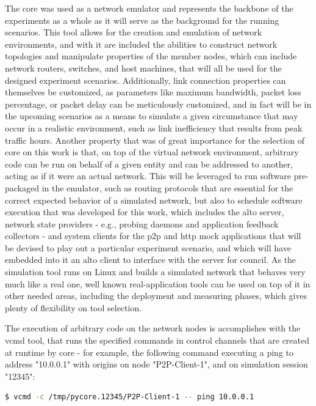     The \gls{core} \cite{core} was used as a network emulator and represents the backbone of the experiments as a whole as it will serve as the background for the running scenarios.
    This tool allows for the creation and emulation of network environments, and with it are included the abilities to construct network topologies and manipulate properties of the member nodes, which can include network routers, switches, and host machines, that will all be used for the designed experiment scenarios.
    Additionally, link connection properties can themselves be customized, as parameters like maximum bandwidth, packet loss percentage, or packet delay can be meticulously customized, and in fact will be in the upcoming scenarios as a means to simulate a given circumstance that may occur in a realistic environment, such as link inefficiency that results from peak traffic hours.
    Another property that was of great importance for the selection of \gls{core} on this work is that, on top of the virtual network environment, arbitrary code can be run on behalf of a given entity and can be addressed to another, acting as if it were an actual network.
    This will be leveraged to run software pre-packaged in the emulator, such as routing protocols that are essential for the correct expected behavior of a simulated network, but also to schedule software execution that was developed for this work, which includes the \gls{alto} server, network state providers - e.g., probing daemons and application feedback collectors - and system clients for the \gls{p2p} and \gls{http} mock applications that will be devised to play out a particular experiment scenario, and which will have embedded into it an \gls{alto} client to interface with the server for council.
    As the simulation tool runs on Linux and builds a simulated network that behaves very much like a real one, well known real-application tools can be used on top of it in other needed areas, including the deployment and measuring phases, which gives plenty of flexibility on tool selection.

    The execution of arbitrary code on the network nodes is accomplishes with the vcmd \cite{vcmd} tool, that runs the specified commands in control channels that are created at runtime by \gls{core} - for example, the following command executing a ping to address "10.0.0.1" with origins on node "P2P-Client-1", and on simulation session "12345":

    \begin{center}
    \begin{lstlisting}[caption=Execution of an example command through the control channel of a given node, language=bash]
$ vcmd -c /tmp/pycore.12345/P2P-Client-1 -- ping 10.0.0.1
    \end{lstlisting}
    \end{center}

